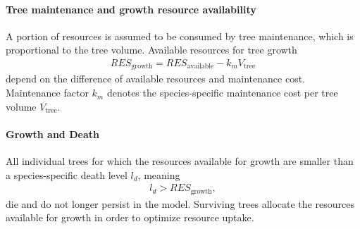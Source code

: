 \documentclass[manusscript, 12p, authoryear]{elsarticle}
\begin{document}
\paragraph{\textbf{Tree maintenance and growth resource availability}}
A portion of resources is assumed to be consumed by tree maintenance, which is proportional to the tree volume.
Available resources for tree growth
\begin{align}
RES_{\text{growth}} = RES_{\text{available}} - k_m V_{\text{tree}}
\end{align}
depend on the difference of available resources and maintenance cost.
Maintenance factor $k_m$ denotes the species-specific maintenance cost per tree volume $V_{\text{tree}}$.
\paragraph{\textbf{Growth and Death}}
All individual trees for which the resources available for growth are smaller than a species-specific death level $l_d$, meaning
\begin{align}
l_d > RES_{\text{growth}},
\end{align}
die and do not longer persist in the model.
Surviving trees allocate the resources available for growth in order to optimize resource uptake.
\end{document}
